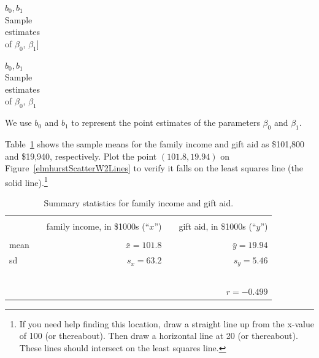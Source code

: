 $b_0, b_1$\vspace{0.5mm}\\\footnotesize Sample\\estimates\\ of $\beta_0$, $\beta_1$]{\raggedright\vspace{0.5mm}

$b_0, b_1$\vspace{0.5mm}\\\footnotesize Sample\\estimates\\ of $\beta_0$, $\beta_1$}We use $b_0$ and $b_1$ to represent the point estimates of the parameters $\beta_0$ and $\beta_1$.

\begin{exercise}
Table~\ref{summaryStatsOfSATGPAData} shows the sample means for the family income and gift aid as \$101,800 and \$19,940, respectively. Plot the point $(101.8, 19.94)$ on Figure~\vref{elmhurstScatterW2Lines} to verify it falls on the least squares line (the solid line).\footnote{If you need help finding this location, draw a straight line up from the x-value of 100 (or thereabout). Then draw a horizontal line at 20 (or thereabout). These lines should intersect on the least squares line.}
\end{exercise}

\begin{table}[ht]
\centering
\begin{tabular}{l rr}
\hline
\vspace{-4mm} & & \\
\vspace{0.4mm}	&	\ \ family income, in \$1000s (``$x$'')	& \ \ gift aid, in \$1000s (``$y$'') \\
\hline
  \vspace{-3.9mm} & & \\
mean	& $\bar{x} = 101.8$		& $\bar{y} = 19.94$ \\
sd		& $s_x = 63.2$		& $s_y = 5.46$\vspace{0.4mm} \\
\hline
\vspace{-4mm}\ &\\
	& \multicolumn{2}{r}{$r=-0.499$} \\
\hline
\end{tabular}
\caption{Summary statistics for family income and gift aid.}
\label{summaryStatsOfSATGPAData}
\end{table}

